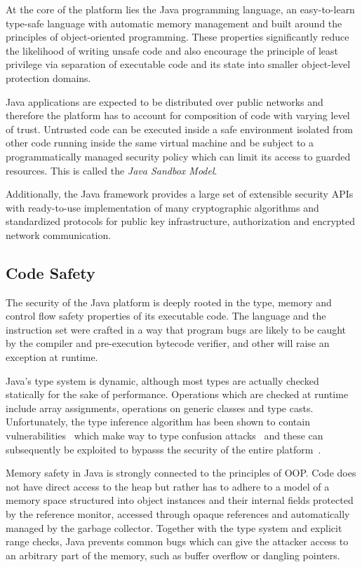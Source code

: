 \documentclass[a4paper,12pt,twoside,openright]{report}
\begin{document}
At the core of the platform lies the Java programming language, an easy-to-learn type-safe language with automatic memory management and built around the principles of object-oriented programming. These properties significantly reduce the likelihood of writing unsafe code and also encourage the principle of least privilege via separation of executable code and its state into smaller object-level protection domains.

Java applications are expected to be distributed over public networks and therefore the platform has to account for composition of code with varying level of trust. Untrusted code can be executed inside a safe environment isolated from other code running inside the same virtual machine and be subject to a programmatically managed security policy which can limit its access to guarded resources. This is called the \emph{Java Sandbox Model}.

Additionally, the Java framework provides a large set of extensible security APIs with ready-to-use implementation of many cryptographic algorithms and standardized protocols for public key infrastructure, authorization and encrypted network communication. 

\subsection{Code Safety}

The security of the Java platform is deeply rooted in the type, memory and control flow safety properties of its executable code. The language and the instruction set were crafted in a way that program bugs are likely to be caught by the compiler and pre-execution bytecode verifier, and other will raise an exception at runtime. 

Java's type system is dynamic, although most types are actually checked statically for the sake of performance. Operations which are checked at runtime include array assignments, operations on generic classes and type casts. Unfortunately, the type inference algorithm has been shown to contain vulnerabilities~\cite{Suenaga:2012:JavaVulnerability} which make way to type confusion attacks~\cite{Oh:2012:JavaExploitReport} and these can subsequently be exploited to bypasss the security of the entire platform~\cite{McGraw:1999:SJG:298616}.

Memory safety in Java is strongly connected to the principles of OOP. Code does not have direct access to the heap but rather has to adhere to a model of a memory space structured into object instances and their internal fields protected by the reference monitor, accessed through opaque references and automatically managed by the garbage collector. Together with the type system and explicit range checks, Java prevents common bugs which can give the attacker access to an arbitrary part of the memory, such as buffer overflow or dangling pointers.
\end{document}
